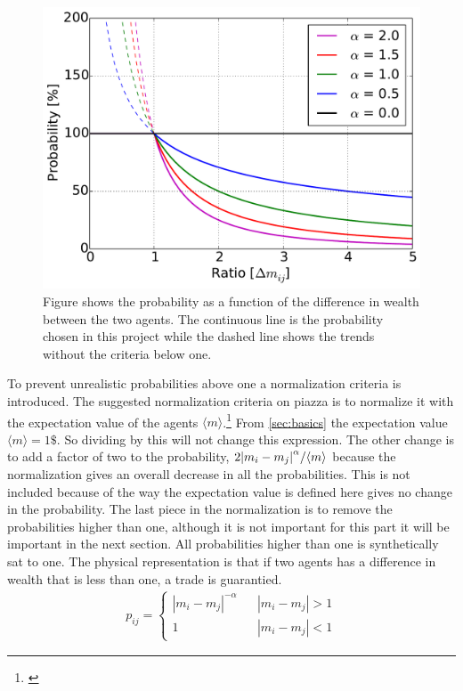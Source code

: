 \begin{figure}[H]
\centering
\includegraphics[width=0.7\linewidth]{theory/bilder/difference}
\caption{Figure shows the probability as a function of the difference in wealth between the two agents. The continuous line is the probability chosen in this project while the dashed line shows the trends without the criteria below one.}
\label{fig:difference}
\end{figure}


To prevent unrealistic probabilities above one a normalization criteria is introduced. The suggested normalization criteria on piazza is to normalize it with the expectation value of the agents $\langle m\rangle$.\footnote{\href{https://piazza.com/class/j6owewp05ym46p?cid=126}{\color{blue}{Piazza: Morten's suggestion} }} From \ref{sec:basics} the expectation value $\langle m\rangle=1\$$. So dividing by this will not change this expression. The other change is to add a factor of two to the probability, $2\abs{m_i-m_j}^\alpha/\langle m\rangle$ because the normalization gives an overall decrease in all the probabilities. This is not included because of the way the expectation value is defined here gives no change in the probability. The last piece in the normalization is to remove the probabilities higher than one, although it is not important for this part it will be important in the next section. All probabilities higher than one is synthetically sat to one. The physical representation is that if two agents has a difference in wealth that is less than one, a trade is guarantied.\\

\begin{align} 
p_{ij}=
\left\{\begin{matrix}
|m_i-m_j|^{-\alpha} && |m_i-m_j|>1 \\ 
1 &&|m_i-m_j|<1
\end{matrix}\right.\label{eq:EPICPROB1}
\end{align}

